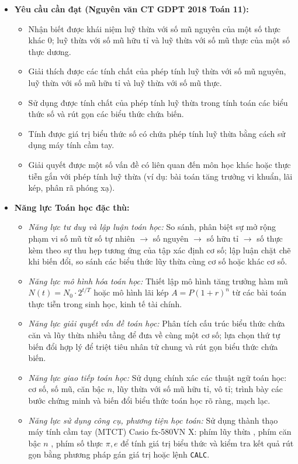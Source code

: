 \documentclass[12pt, a4paper]{article}
\begin{document}
\begin{itemize}[leftmargin=1.2cm]
    \item \textbf{Yêu cầu cần đạt (Nguyên văn CT GDPT 2018 Toán 11):}
    \begin{itemize}[leftmargin=0.6cm]
        \item Nhận biết được khái niệm luỹ thừa với số mũ nguyên của một số thực khác $0$; luỹ thừa với số mũ hữu tỉ và luỹ thừa với số mũ thực của một số thực dương.
        \item Giải thích được các tính chất của phép tính luỹ thừa với số mũ nguyên, luỹ thừa với số mũ hữu tỉ và luỹ thừa với số mũ thực.
        \item Sử dụng được tính chất của phép tính luỹ thừa trong tính toán các biểu thức số và rút gọn các biểu thức chứa biến.
        \item Tính được giá trị biểu thức số có chứa phép tính luỹ thừa bằng cách sử dụng máy tính cầm tay.
        \item Giải quyết được một số vấn đề có liên quan đến môn học khác hoặc thực tiễn gắn với phép tính luỹ thừa (ví dụ: bài toán tăng trưởng vi khuẩn, lãi kép, phân rã phóng xạ).
    \end{itemize}

    \item \textbf{Năng lực Toán học đặc thù:}
    \begin{itemize}[leftmargin=0.6cm]
        \item \textit{Năng lực tư duy và lập luận toán học:} So sánh, phân biệt sự mở rộng phạm vi số mũ từ số tự nhiên $\to$ số nguyên $\to$ số hữu tỉ $\to$ số thực kèm theo sự thu hẹp tương ứng của tập xác định cơ số; lập luận chặt chẽ khi biến đổi, so sánh các biểu thức lũy thừa cùng cơ số hoặc khác cơ số.
        \item \textit{Năng lực mô hình hóa toán học:} Thiết lập mô hình tăng trưởng hàm mũ $N(t) = N_0 \cdot 2^{t/T}$ hoặc mô hình lãi kép $A = P(1 + r)^n$ từ các bài toán thực tiễn trong sinh học, kinh tế tài chính.
        \item \textit{Năng lực giải quyết vấn đề toán học:} Phân tích cấu trúc biểu thức chứa căn và lũy thừa nhiều tầng để đưa về cùng một cơ số; lựa chọn thứ tự biến đổi hợp lý để triệt tiêu nhân tử chung và rút gọn biểu thức chứa biến.
        \item \textit{Năng lực giao tiếp toán học:} Sử dụng chính xác các thuật ngữ toán học: cơ số, số mũ, căn bậc $n$, lũy thừa với số mũ hữu tỉ, vô tỉ; trình bày các bước chứng minh và biến đổi biểu thức toán học rõ ràng, mạch lạc.
        \item \textit{Năng lực sử dụng công cụ, phương tiện học toán:} Sử dụng thành thạo máy tính cầm tay (MTCT) Casio fx-580VN X: phím lũy thừa , phím căn bậc $n$ \fbox{$\sqrt[\blacksquare]{\blacksquare}$}, phím số thực $\pi, e$ để tính giá trị biểu thức và kiểm tra kết quả rút gọn bằng phương pháp gán giá trị hoặc lệnh \texttt{CALC}.
    \end{itemize}


\end{itemize}
\end{document}
